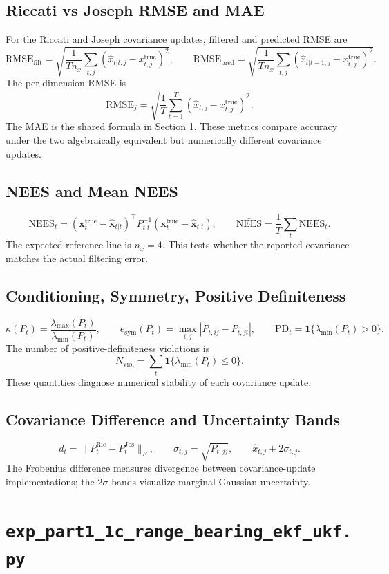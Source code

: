 \documentclass[11pt]{article}
\newcommand{\code}[1]{\texttt{#1}}
\newcommand{\RMSE}{\mathrm{RMSE}}
\newcommand{\NEES}{\mathrm{NEES}}
\newcommand{\ind}{\mathbf{1}}
\begin{document}
\subsection*{Riccati vs Joseph RMSE and MAE}
For the Riccati and Joseph covariance updates, filtered and predicted RMSE are
\[
\RMSE_{\mathrm{filt}}=\sqrt{\frac{1}{Tn_x}\sum_{t,j}(\hat x_{t|t,j}-x^{\mathrm{true}}_{t,j})^2},
\qquad
\RMSE_{\mathrm{pred}}=\sqrt{\frac{1}{Tn_x}\sum_{t,j}(\hat x_{t|t-1,j}-x^{\mathrm{true}}_{t,j})^2}.
\]
The per-dimension RMSE is
\[
\RMSE_j=\sqrt{\frac{1}{T}\sum_{t=1}^T(\hat x_{t,j}-x^{\mathrm{true}}_{t,j})^2}.
\]
The MAE is the shared formula in Section 1. These metrics compare accuracy under the two algebraically equivalent but numerically different covariance updates.

\subsection*{NEES and Mean NEES}
\[
\NEES_t=(\bm{x}^{\mathrm{true}}_t-\hat{\bm{x}}_{t|t})^\top P_{t|t}^{-1}(\bm{x}^{\mathrm{true}}_t-\hat{\bm{x}}_{t|t}),
\qquad
\bar{\NEES}=\frac{1}{T}\sum_t\NEES_t.
\]
The expected reference line is \(n_x=4\). This tests whether the reported covariance matches the actual filtering error.

\subsection*{Conditioning, Symmetry, Positive Definiteness}
\[
\kappa(P_t)=\frac{\lambda_{\max}(P_t)}{\lambda_{\min}(P_t)},\qquad
e_{\mathrm{sym}}(P_t)=\max_{i,j}|P_{t,ij}-P_{t,ji}|,
\qquad
\mathrm{PD}_t=\ind\{\lambda_{\min}(P_t)>0\}.
\]
The number of positive-definiteness violations is
\[
N_{\mathrm{viol}}=\sum_t\ind\{\lambda_{\min}(P_t)\le 0\}.
\]
These quantities diagnose numerical stability of each covariance update.

\subsection*{Covariance Difference and Uncertainty Bands}
\[
d_t=\|P^{\mathrm{Ric}}_t-P^{\mathrm{Jos}}_t\|_F,
\qquad
\sigma_{t,j}=\sqrt{P_{t,jj}},\qquad
\hat x_{t,j}\pm 2\sigma_{t,j}.
\]
The Frobenius difference measures divergence between covariance-update implementations; the \(2\sigma\) bands visualize marginal Gaussian uncertainty.

\section{\code{exp\_part1\_1c\_range\_bearing\_ekf\_ukf.py}}
\end{document}

